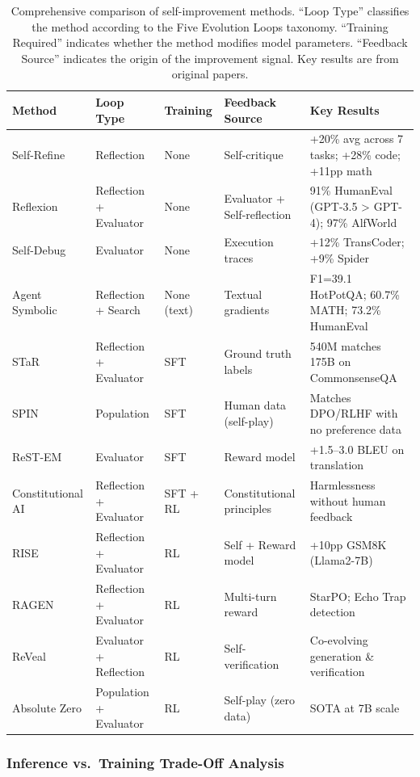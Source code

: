 \begin{table}[t]
\centering
\caption{Comprehensive comparison of self-improvement methods. ``Loop Type'' classifies the method according to the Five Evolution Loops taxonomy. ``Training Required'' indicates whether the method modifies model parameters. ``Feedback Source'' indicates the origin of the improvement signal. Key results are from original papers.}
\label{tab:comprehensive-comparison}
\small
\begin{tabular}{@{}p{2.0cm}p{1.8cm}p{1.3cm}p{1.8cm}p{4.5cm}@{}}
\toprule
\textbf{Method} & \textbf{Loop Type} & \textbf{Training} & \textbf{Feedback Source} & \textbf{Key Results} \\
\midrule
Self-Refine & Reflection & None & Self-critique & +20\% avg across 7 tasks; +28\% code; +11pp math \\
Reflexion & Reflection + Evaluator & None & Evaluator + Self-reflection & 91\% HumanEval (GPT-3.5 > GPT-4); 97\% AlfWorld \\
Self-Debug & Evaluator & None & Execution traces & +12\% TransCoder; +9\% Spider \\
Agent Symbolic & Reflection + Search & None (text) & Textual gradients & F1=39.1 HotPotQA; 60.7\% MATH; 73.2\% HumanEval \\
\midrule
STaR & Reflection + Evaluator & SFT & Ground truth labels & 540M matches 175B on CommonsenseQA \\
SPIN & Population & SFT & Human data (self-play) & Matches DPO/RLHF with no preference data \\
ReST-EM & Evaluator & SFT & Reward model & +1.5--3.0 BLEU on translation \\
Constitutional AI & Reflection + Evaluator & SFT + RL & Constitutional principles & Harmlessness without human feedback \\
\midrule
RISE & Reflection + Evaluator & RL & Self + Reward model & +10pp GSM8K (Llama2-7B) \\
RAGEN & Reflection + Evaluator & RL & Multi-turn reward & StarPO; Echo Trap detection \\
ReVeal & Evaluator + Reflection & RL & Self-verification & Co-evolving generation \& verification \\
Absolute Zero & Population + Evaluator & RL & Self-play (zero data) & SOTA at 7B scale \\
\bottomrule
\end{tabular}
\end{table}


\subsubsection{Inference vs.\ Training Trade-Off Analysis}

